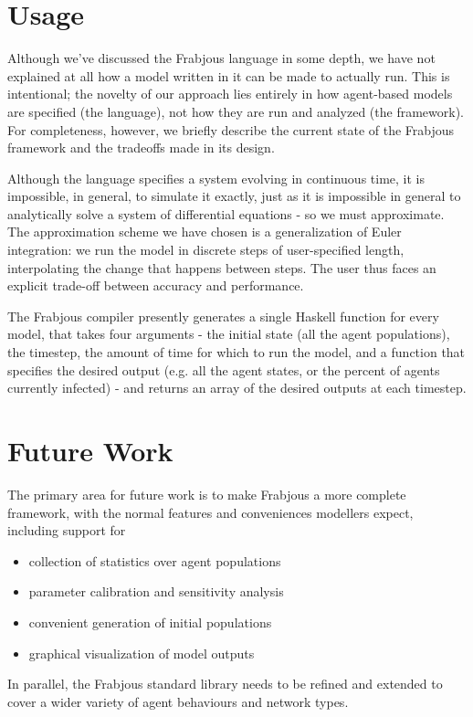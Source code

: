 \documentclass{llncs}
\begin{document}
\section{Usage}
Although we've discussed the Frabjous language in some depth, we have not explained at all how a model written in it can be made to actually run. This is intentional; the novelty of our approach lies entirely in how agent-based models are specified (the language), not how they are run and analyzed (the framework). For completeness, however, we briefly describe the current state of the Frabjous framework and the tradeoffs made in its design. 

Although the language specifies a system evolving in continuous time, it is impossible, in general, to simulate it exactly, just as it is impossible in general to analytically solve a system of differential equations - so we must approximate. The approximation scheme we have chosen is a generalization of Euler integration: we run the model in discrete steps of user-specified length, interpolating the change that happens between steps. The user thus faces an explicit trade-off between accuracy and performance.

The Frabjous compiler presently generates a single Haskell function for every model, that takes four arguments - the initial state (all the agent populations), the timestep, the amount of time for which to run the model, and a function that specifies the desired output (e.g. all the agent states, or the percent of agents currently infected) - and returns an array of the desired outputs at each timestep. 

\section{Future Work}
The primary area for future work is to make Frabjous a more complete framework, with the normal features and conveniences modellers expect, including support for
\begin{itemize}
\renewcommand{\labelitemi}{$\bullet$}
\item collection of statistics over agent populations
\item parameter calibration and sensitivity analysis
\item convenient generation of initial populations
\item graphical visualization of model outputs
\end{itemize}

In parallel, the Frabjous standard library needs to be refined and extended to cover a wider variety of agent behaviours and network types. 
\end{document}
